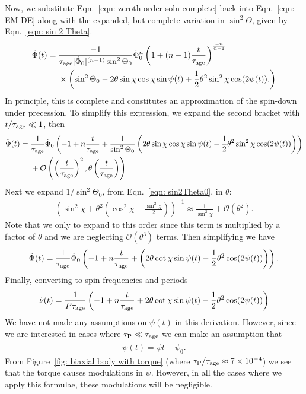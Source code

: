\documentclass[../full_thesis/full_thesis.tex]{subfiles}
\begin{document}
Now, we substitute Eqn.~\eqref{eqn: zeroth order soln complete} back into
Eqn.~\eqref{eqn: EM DE} along with the expanded, but complete variation in
$\sin^{2}\Theta$, given by Eqn.~\eqref{eqn: sin 2 Theta}.
\begin{align}
\begin{split}
\ddot{\Phi}(t)  = {} & \frac{-1}{\tau_{\mathrm{age}} |\dot{\Phi}_0|^{(n-1)} \sin^{2}\Theta_0}
\dot{\Phi}_0^n\left(1 + (n-1)\frac{t}{\tau_{\mathrm{age}}}\right)^{\frac{-n}{n-1}} \\
& \times \left(\sin^{2}\Theta_0
- 2\theta \sin\chi\cos\chi \sin\psi(t)
 + \frac{1}{2}\theta^{2}\sin^{2}\chi\cos(2\psi(t)).
\right)
\end{split}
\end{align}
In principle, this is complete and constitutes an approximation of the spin-down
under precession.
To simplify this expression, we expand the second bracket with $t/\tau_{\mathrm{age}}\ll1$, then
\begin{align}
\begin{split}
\ddot{\Phi}(t) = {} & \frac{1}{\tau_{\mathrm{age}}} \dot{\Phi}_0
\left(-1 + n\frac{t}{\tau_{\mathrm{age}}} +
\frac{1}{\sin^{2}\Theta_0}\left(
2\theta \sin\chi\cos\chi \sin\psi(t)
- \frac{1}{2}\theta^{2}\sin^{2}\chi\cos(2\psi(t))
\right)\right) \\
& +
\mathcal{O}\left(\left(\frac{t}{\tau_{\mathrm{age}}}\right)^{2},
                 \theta\left(\frac{t}{\tau_{\mathrm{age}}}\right)\right)
\end{split}
\end{align}
Next we expand $1/\sin^{2}\Theta_0$, from Eqn.~\eqref{eqn: sin2Theta0}, in $\theta$:
\begin{align}
\left(\sin^{2}\chi + \theta^{2}\left(\cos^{2}\chi - \frac{\sin^{2}\chi}{2}\right)\right)^{-1}
\approx
\frac{1}{\sin^{2}\chi} + \mathcal{O}(\theta^{2}).
\end{align}
Note that we only to expand to this order since this term is multiplied by a
factor of $\theta$ and we are neglecting $\mathcal{O}(\theta^{3})$ terms.
Then simplifying we have
\begin{align}
\ddot{\Phi}(t) = \frac{1}{\tau_{\mathrm{age}}} \dot{\Phi}_0
\left(-1 + n \frac{t}{\tau_{\mathrm{age}}} +
\left( 2\theta \cot\chi \sin\psi(t)
- \frac{1}{2}\theta^{2}\cos(2\psi(t))
\right)\right).
\end{align}
Finally, converting to spin-frequencies and periods
\begin{align}
\dot{\nu}(t) = \frac{1}{P\tau_{\mathrm{age}}}
\left(-1 + n \frac{t}{\tau_{\mathrm{age}}} +
2\theta \cot\chi \sin\psi(t)
- \frac{1}{2}\theta^{2}\cos(2\psi(t))
\right)
\label{eqn: spin-down rate}
\end{align}
We have not made any assumptions on $\psi(t)$ in this derivation. However, since
we are interested in cases where $\tau_{\mathrm{P}} \ll \tau_{\mathrm{age}}$ we can make an assumption
that
\begin{align}
\psi(t) = \dot{\psi} t + \psi_0.
\end{align}
From Figure~\ref{fig: biaxial body with torque} (where $\tau_{\mathrm{P}}/\tau_{\mathrm{age}} \approx
7\times10^{-4}$) we see that the torque causes modulations in $\dot{\psi}$.
However, in all the cases where we apply this formulae, these modulations will
be negligible.
\end{document}
